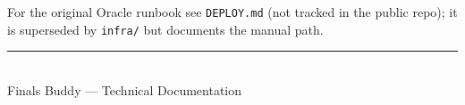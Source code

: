\documentclass[11pt,a4paper]{article}
\newcommand{\code}[1]{\colorbox{fbCream}{\texttt{\small #1}}}
\begin{document}
For the original Oracle runbook see \code{DEPLOY.md} (not tracked in the public
repo); it is superseded by \code{infra/} but documents the manual path.

\vfill
\begin{center}
{\color{fbSage}\rule{0.4\textwidth}{1.5pt}}\\[0.4cm]
{\color{fbMute}\small Finals Buddy --- Technical Documentation}
\end{center}
\end{document}
